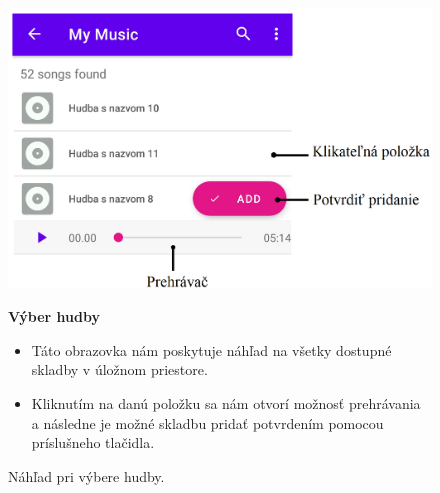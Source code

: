 \documentclass[12pt, oneside]{book}
\begin{document}
\begin{figure}[H]
\begin{minipage}[b]{0.55\linewidth}
  \includegraphics[width=1\textwidth]{images/audio.png}
    \caption{Náhľad pri výbere hudby. }
    \label{fig:obr12}
\end{minipage}
\hspace{0.5cm}
\begin{minipage}[b]{0.4\linewidth}

 \vspace{40pt} 

    \hspace{15pt} \textbf{Výber hudby}

 \begin{itemize}
        \item Táto obrazovka nám poskytuje náhľad na všetky dostupné skladby v úložnom priestore.
        \item Kliknutím na danú položku sa nám otvorí možnosť prehrávania a následne je možné skladbu pridať potvrdením pomocou príslušneho tlačidla.
       
    \end{itemize}
    
\end{minipage}
\end{figure}
\end{document}
